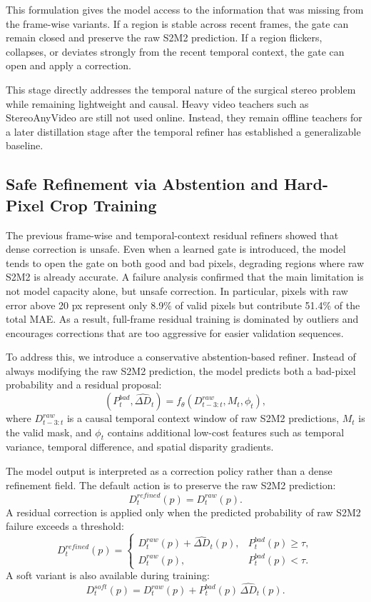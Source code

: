 \documentclass[11pt,a4paper]{article}
\begin{document}
This formulation gives the model access to the information that was missing from
the frame-wise variants. If a region is stable across recent frames, the gate can
remain closed and preserve the raw S2M2 prediction. If a region flickers,
collapses, or deviates strongly from the recent temporal context, the gate can
open and apply a correction.

This stage directly addresses the temporal nature of the surgical stereo problem
while remaining lightweight and causal. Heavy video teachers such as
StereoAnyVideo are still not used online. Instead, they remain offline teachers
for a later distillation stage after the temporal refiner has established a
generalizable baseline.

\subsection{Safe Refinement via Abstention and Hard-Pixel Crop Training}

The previous frame-wise and temporal-context residual refiners showed that dense
correction is unsafe. Even when a learned gate is introduced, the model tends to
open the gate on both good and bad pixels, degrading regions where raw S2M2 is
already accurate. A failure analysis confirmed that the main limitation is not
model capacity alone, but unsafe correction. In particular, pixels with raw error
above 20 px represent only 8.9\% of valid pixels but contribute 51.4\% of the
total MAE. As a result, full-frame residual training is dominated by outliers and
encourages corrections that are too aggressive for easier validation sequences.

To address this, we introduce a conservative abstention-based refiner. Instead
of always modifying the raw S2M2 prediction, the model predicts both a bad-pixel
probability and a residual proposal:
\[
(P_t^{bad}, \widehat{\Delta D}_t)
=
f_{\theta}
\left(
D_{t-3:t}^{raw},
M_t,
\phi_t
\right),
\]
where \(D_{t-3:t}^{raw}\) is a causal temporal context window of raw S2M2
predictions, \(M_t\) is the valid mask, and \(\phi_t\) contains additional
low-cost features such as temporal variance, temporal difference, and spatial
disparity gradients.

The model output is interpreted as a correction policy rather than a dense
refinement field. The default action is to preserve the raw S2M2 prediction:
\[
D_t^{refined}(p) = D_t^{raw}(p).
\]
A residual correction is applied only when the predicted probability of raw S2M2
failure exceeds a threshold:
\[
D_t^{refined}(p)
=
\begin{cases}
D_t^{raw}(p) + \widehat{\Delta D}_t(p),
&
P_t^{bad}(p) \geq \tau, \\
D_t^{raw}(p),
&
P_t^{bad}(p) < \tau.
\end{cases}
\]
A soft variant is also available during training:
\[
D_t^{soft}(p)
=
D_t^{raw}(p)
+
P_t^{bad}(p)\,\widehat{\Delta D}_t(p).
\]
\end{document}
